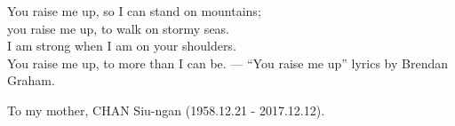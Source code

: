 \noindent You raise me up, so I can stand on mountains;\\
you raise me up, to walk on stormy seas.\\
I am strong when I am on your shoulders.\\
You raise me up, to more than I can be. --- ``You raise me up'' lyrics by Brendan Graham.\\

\par \hfill To my mother, CHAN Siu-ngan (1958.12.21 - 2017.12.12).\\